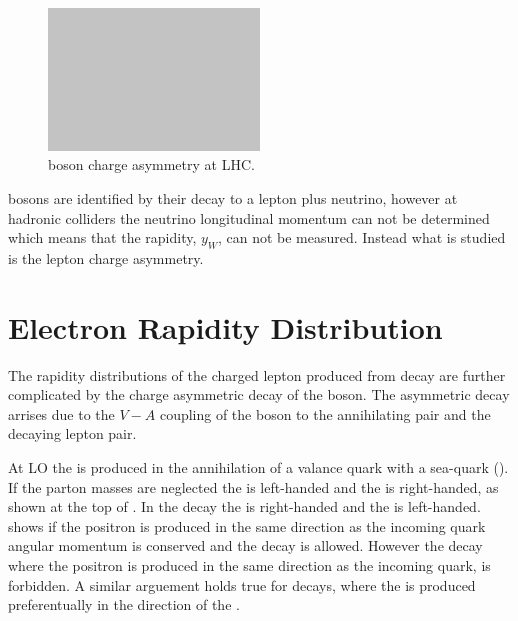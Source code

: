 \begin{figure}[htb]
  \centering
  \includegraphics[width=0.5\textwidth]{placeholder}
  \caption{\PW boson charge asymmetry at LHC.}
  \label{wbos:wproddiag}
\end{figure}

\PW bosons are identified by their decay to a lepton plus neutrino, however at
hadronic colliders the neutrino longitudinal momentum can not be determined
which means that the \PW rapidity, $y_{W}$, can not be measured.  Instead what
is studied is the lepton charge asymmetry.



\section{Electron Rapidity Distribution}

The rapidity distributions of the charged lepton produced from \PW decay are
further complicated by the charge asymmetric decay of the \PWpm boson. 
The asymmetric decay arrises due to the $V-A$ coupling of the \PW boson to the
annihilating \HepProcess{\Pquark\APquark} pair and the decaying lepton pair.

At \ac{LO} the \PWp is produced in the annihilation of a \Pup valance quark
with a \APdown sea-quark (). 
If the parton masses are neglected the \Pup is left-handed and the \APdown is
right-handed, as shown at the top of . 
In the \PWp decay the \Ppositron is right-handed and the \Pnue is left-handed.
 shows if the  positron is produced in the same direction
as the incoming \APdown quark angular momentum is conserved and the decay is
allowed.
However the decay where the positron is produced in the same direction as the
incoming \Pup quark, is forbidden.
A similar arguement holds true for \PWm decays, where the \Pelectron is produced
preferentually in the direction of the \Pdown.

